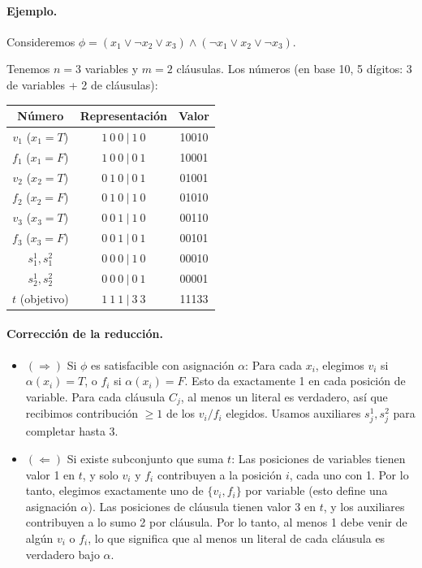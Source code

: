 \documentclass[11pt]{article}
\begin{document}
\paragraph{Ejemplo.} Consideremos $\phi = (x_1 \lor \neg x_2 \lor x_3) \land (\neg x_1 \lor x_2 \lor \neg x_3)$.

Tenemos $n=3$ variables y $m=2$ cláusulas. Los números (en base 10, 5 dígitos: 3 de variables + 2 de cláusulas):

\begin{center}
\begin{tabular}{|c|c|c|}
\hline
Número & Representación & Valor \\
\hline
$v_1$ ($x_1=T$) & $1\ 0\ 0\ |\ 1\ 0$ & 10010 \\
$f_1$ ($x_1=F$) & $1\ 0\ 0\ |\ 0\ 1$ & 10001 \\
$v_2$ ($x_2=T$) & $0\ 1\ 0\ |\ 0\ 1$ & 01001 \\
$f_2$ ($x_2=F$) & $0\ 1\ 0\ |\ 1\ 0$ & 01010 \\
$v_3$ ($x_3=T$) & $0\ 0\ 1\ |\ 1\ 0$ & 00110 \\
$f_3$ ($x_3=F$) & $0\ 0\ 1\ |\ 0\ 1$ & 00101 \\
$s_1^1, s_1^2$ & $0\ 0\ 0\ |\ 1\ 0$ & 00010 \\
$s_2^1, s_2^2$ & $0\ 0\ 0\ |\ 0\ 1$ & 00001 \\
\hline
$t$ (objetivo) & $1\ 1\ 1\ |\ 3\ 3$ & 11133 \\
\hline
\end{tabular}
\end{center}

\paragraph{Corrección de la reducción.}
\begin{itemize}
  \item $(\Rightarrow)$ Si $\phi$ es satisfacible con asignación $\alpha$: Para cada $x_i$, elegimos $v_i$ si $\alpha(x_i)=T$, o $f_i$ si $\alpha(x_i)=F$. Esto da exactamente 1 en cada posición de variable. Para cada cláusula $C_j$, al menos un literal es verdadero, así que recibimos contribución $\ge 1$ de los $v_i/f_i$ elegidos. Usamos auxiliares $s_j^1, s_j^2$ para completar hasta 3.
  
  \item $(\Leftarrow)$ Si existe subconjunto que suma $t$: Las posiciones de variables tienen valor 1 en $t$, y solo $v_i$ y $f_i$ contribuyen a la posición $i$, cada uno con 1. Por lo tanto, elegimos exactamente uno de $\{v_i, f_i\}$ por variable (esto define una asignación $\alpha$). Las posiciones de cláusula tienen valor 3 en $t$, y los auxiliares contribuyen a lo sumo 2 por cláusula. Por lo tanto, al menos 1 debe venir de algún $v_i$ o $f_i$, lo que significa que al menos un literal de cada cláusula es verdadero bajo $\alpha$.
\end{itemize}
\end{document}
